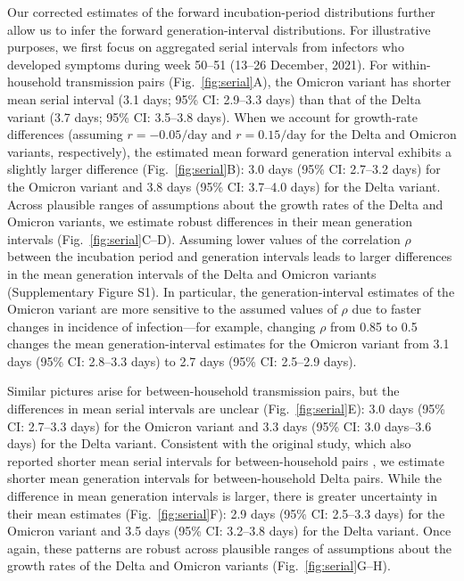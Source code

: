 \documentclass[12pt]{article}
\newcommand{\fref}[1]{Fig.~\ref{fig:#1}}
\begin{document}
Our corrected estimates of the forward incubation-period distributions further allow us to infer the forward generation-interval distributions.
For illustrative purposes, we first focus on aggregated serial intervals from infectors who developed symptoms during week 50--51 (13--26 December, 2021).
For within-household transmission pairs (\fref{serial}A), the Omicron variant has shorter mean serial interval (3.1 days; 95\% CI: 2.9--3.3 days) than that of the Delta variant (3.7 days; 95\% CI: 3.5--3.8 days).
When we account for growth-rate differences (assuming $r=-0.05/\mathrm{day}$ and $r=0.15/\mathrm{day}$ for the Delta and Omicron variants, respectively), the estimated mean forward generation interval exhibits a slightly larger difference (\fref{serial}B):
3.0 days (95\% CI: 2.7--3.2 days) for the Omicron variant and 3.8 days (95\% CI: 3.7--4.0 days) for the Delta variant.
Across plausible ranges of assumptions about the growth rates of the Delta and Omicron variants, we estimate robust differences in their mean generation intervals (\fref{serial}C--D).
Assuming lower values of the correlation $\rho$ between the incubation period and generation intervals leads to larger differences in the mean generation intervals of the Delta and Omicron variants (Supplementary Figure S1).
In particular, the generation-interval estimates of the Omicron variant are more sensitive to the assumed values of $\rho$ due to faster changes in incidence of infection---for example, changing $\rho$ from 0.85 to 0.5 changes the mean generation-interval estimates for the Omicron variant from 3.1 days (95\% CI: 2.8--3.3 days) to 2.7 days (95\% CI: 2.5--2.9 days).

Similar pictures arise for between-household transmission pairs, but the differences in mean serial intervals are unclear (\fref{serial}E): 3.0 days (95\% CI: 2.7--3.3 days) for the Omicron variant and 3.3 days (95\% CI: 3.0 days--3.6 days) for the Delta variant.
Consistent with the original study, which also reported shorter mean serial intervals for between-household pairs \citep{backer2021omicron}, we estimate shorter mean generation intervals for between-household Delta pairs.
While the difference in mean generation intervals is larger, there is greater uncertainty in their mean estimates (\fref{serial}F): 2.9 days (95\% CI: 2.5--3.3 days) for the Omicron variant and 3.5 days (95\% CI: 3.2--3.8 days) for the Delta variant.
Once again, these patterns are robust across plausible ranges of assumptions about the growth rates of the Delta and Omicron variants (\fref{serial}G--H).
\end{document}
